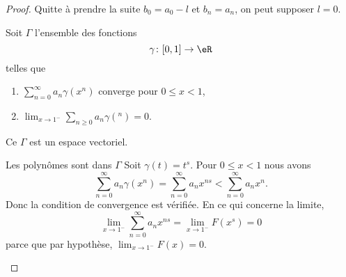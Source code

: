 \begin{proof}
    Quitte à prendre la suite \( b_0=a_0-l\) et \( b_n=a_n\), on peut supposer \( l=0\).

    Soit \( \Gamma\) l'ensemble des fonctions
    \begin{equation}
         \gamma\colon \mathopen[ 0 , 1 \mathclose]\to \eR 
    \end{equation}
    telles que 
    \begin{enumerate}
        \item
            $\sum_{n=0}^{\infty}a_n\gamma(x^n)$ converge pour \( 0\leq x<1\),
        \item
            \( \lim_{x\to 1^-} \sum_{n\geq 0}a_n\gamma(^n)=0\).
    \end{enumerate}
    Ce \( \Gamma\) est un espace vectoriel.
    \begin{subproof}
    \item[Les polynômes sont dans \( \Gamma\)]
        Soit \( \gamma(t)=t^s\). Pour \( 0\leq x<1\) nous avons
        \begin{equation}
            \sum_{n=0}^{\infty}a_n\gamma(x^n)=\sum_{n=0}^{\infty}a_nx^{ns}<\sum_{n=0}^{\infty}a_nx^n.
        \end{equation}
        Donc la condition de convergence est vérifiée. En ce qui concerne la limite,
        \begin{equation}
            \lim_{x\to 1^-} \sum_{n=0}^{\infty}a_nx^{ns}=\lim_{x\to 1^-} F(x^s)=0
        \end{equation}
        parce que par hypothèse, \( \lim_{x\to 1^-} F(x)=0\).


\end{subproof}
\end{proof}
